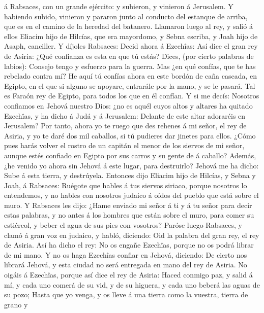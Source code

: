 á Rabsaces, con un grande ejército: y subieron, y vinieron á Jerusalem.
Y habiendo subido, vinieron y pararon junto al conducto del estanque de
arriba, que es en el camino de la heredad del batanero. 
Llamaron luego al rey, y salió á ellos Eliacim hijo de Hilcías, que era
mayordomo, y Sebna escriba, y Joah hijo de Asaph, canciller.
 Y díjoles Rabsaces: Decid ahora á Ezechîas: Así dice el
gran rey de Asiria: ¿Qué confianza es esta en que tú estás?
 Dices, (por cierto palabras de labios): Consejo tengo y
esfuerzo para la guerra. Mas ¿en qué confías, que te has rebelado contra
mí?  He aquí tú confías ahora en este bordón de caña
cascada, en Egipto, en el que si alguno se apoyare, entrarále por la
mano, y se le pasará. Tal es Faraón rey de Egipto, para todos los que en
él confían.  Y si me decís: Nosotros confiamos en Jehová
nuestro Dios: ¿no es aquél cuyos altos y altares ha quitado Ezechîas, y
ha dicho á Judá y á Jerusalem: Delante de este altar adoraréis en
Jerusalem?  Por tanto, ahora yo te ruego que des rehenes
á mi señor, el rey de Asiria, y yo te daré dos mil caballos, si tú
pudieres dar jinetes para ellos.  ¿Cómo pues harás volver
el rostro de un capitán el menor de los siervos de mi señor, aunque
estés confiado en Egipto por sus carros y su gente de á caballo?
 Además, ¿he venido yo ahora sin Jehová á este lugar,
para destruirlo? Jehová me ha dicho: Sube á esta tierra, y destrúyela.
 Entonces dijo Eliacim hijo de Hilcías, y Sebna y Joah, á
Rabsaces: Ruégote que hables á tus siervos siriaco, porque nosotros lo
entendemos, y no hables con nosotros judaico á oídos del pueblo que está
sobre el muro.  Y Rabsaces les dijo: ¿Hame enviado mi
señor á ti y á tu señor para decir estas palabras, y no antes á los
hombres que están sobre el muro, para comer su estiércol, y beber el
agua de sus pies con vosotros?  Paróse luego Rabsaces, y
clamó á gran voz en judaico, y habló, diciendo: Oid la palabra del gran
rey, el rey de Asiria.  Así ha dicho el rey: No os engañe
Ezechîas, porque no os podrá librar de mi mano.  Y no os
haga Ezechîas confiar en Jehová, diciendo: De cierto nos librará Jehová,
y esta ciudad no será entregada en mano del rey de Asiria.
 No oigáis á Ezechîas, porque así dice el rey de Asiria:
Haced conmigo paz, y salid á mí, y cada uno comerá de su vid, y de su
higuera, y cada uno beberá las aguas de su pozo;  Hasta
que yo venga, y os lleve á una tierra como la vuestra, tierra de grano y
